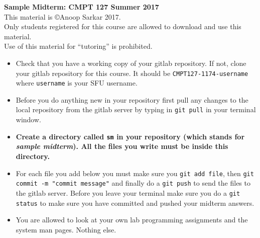 \documentclass[11pt]{article}
\begin{document}
\begin{center}
{\Large\bf Sample Midterm: CMPT 127 Summer 2017}\\
This material is \copyright Anoop Sarkar 2017. \\
Only students registered for this course are allowed to download and use this material. \\
Use of this material for ``tutoring'' is prohibited.
\end{center}


\begin{itemize}\addtolength{\itemsep}{-0.3\baselineskip}

\item Check that you have a working copy of your gitlab repository.
If not, clone your gitlab repository for this course. It should be
\texttt{CMPT127-1174-username} where \texttt{username} is your SFU
username.

\item Before you do anything new in your repository first pull any
changes to the local repository from the gitlab server by typing
in \texttt{git pull} in your terminal window.

\item \textbf{Create a directory called \texttt{sm} in your repository
(which stands for \textit{sample midterm}).  All the files you write
must be inside this directory.}

\item For each file you add below you must make sure you \texttt{git
add file}, then \texttt{git commit -m "commit message"} and finally
do a \texttt{git push} to send the files to the gitlab server.
Before you leave your terminal make sure you do a \texttt{git
status} to make sure you have committed and pushed your midterm
answers.

\item You are allowed to look at your own lab programming assignments
and the system man pages. Nothing else.

\end{itemize}
\end{document}
